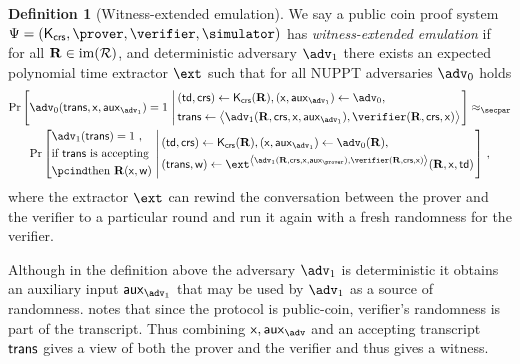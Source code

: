 \documentclass[runningheads]{llncs}
\theoremstyle{definition}
\newtheorem{definition}[theorem]{Definition}
\begin{document}
\begin{definition}[Witness-extended emulation]
	\label{def:wit_ext_em}
	We say a public coin proof system $\proofsystem = (\kcrs, \prover, \verifier, \simulator)$ has \emph{witness-extended emulation} if for all $\mathbf{R} \in \operatorname{im}(\mathcal{R})$, and deterministic adversary $\adv_1$ there exists an expected polynomial time extractor $\ext$ such that for all NUPPT adversaries $\adv_0$ holds
		\begin{multline*}
		\Pr\left[\adv_0 (\trans, \inp, \aux_{\adv_1}) = 1 \,\left|\,
		\begin{aligned}
				& (\td, \crs) \gets \kcrs(\REL), (\inp, \aux_{\adv_1}) \gets \adv_0, \\
				& \trans \gets \ip{\adv_1(\REL, \crs, \inp, \aux_{\adv_1})}{\verifier(\REL, \crs, \inp)}
			\end{aligned}
		\right.
		\right]
		 \approx_\secpar \\
		 \Pr\left[
			\begin{aligned}
				& \adv_1 (\trans) = 1\ , \\
				& \text{if $\trans$ is accepting} \\ 
				& \pcind \text{then $\REL(\inp, \wit)$}
			\end{aligned}\,\left|\,
			\begin{aligned}
				& (\td, \crs) \gets \kcrs(\REL), (\inp, \aux_{\adv_1}) \gets \adv_0(\REL), \\ 
				& (\trans, \wit )\gets \ext^{\ip{\adv_1(\REL, \crs, \inp, \aux_\prover)}{\verifier(\REL, \crs, \inp)}}(\REL, \inp, \td)
			\end{aligned}
			\vphantom{\begin{aligned}
				\adv (\trans) = 1, \\
				\text{if $\trans{}$ is accepting} \\ 
				\pcind \text{then $\REL(\inp, \wit)$}
			\end{aligned}}\right.
			\right]\,,
\end{multline*}
where the extractor $\ext$ can rewind the conversation between the prover and the verifier to a particular round and run it again with a fresh randomness for the verifier. 
\end{definition} 
Although in the definition above the adversary $\adv_1$ is deterministic it obtains an auxiliary input $\aux_{\adv_1}$ that may be used by $\adv_1$ as a source of randomness. \cite{EC:GroIsh08} notes that since the protocol is public-coin, verifier's randomness is part of the transcript. Thus combining $\inp, \aux_\adv$ and an accepting transcript $\mathsf{trans}$ gives a view of both the prover and the verifier and thus gives a witness.
\end{document}
